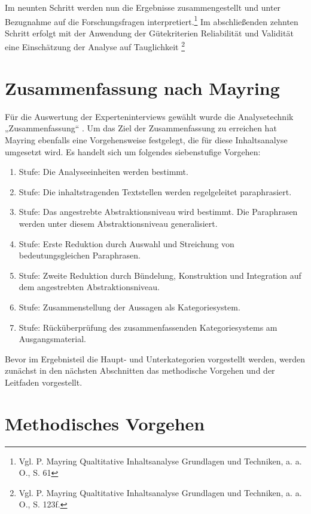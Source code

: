 Im neunten Schritt werden nun die Ergebnisse zusammengestellt und unter Bezugnahme auf die Forschungsfragen interpretiert.\footnote {Vgl. P. Mayring Qualtitative Inhaltsanalyse Grundlagen und Techniken, a. a. O., S. 61}
Im abschließenden zehnten Schritt erfolgt mit der Anwendung der Gütekriterien Reliabilität und Validität eine Einschätzung der Analyse auf Tauglichkeit \footnote {Vgl. P. Mayring Qualtitative Inhaltsanalyse Grundlagen und Techniken, a. a. O., S. 123f.}

\section{Zusammenfassung nach Mayring}

Für die Auswertung der Experteninterviews gewählt wurde die Analysetechnik „Zusammenfassung“ . Um das Ziel der Zusammenfassung zu erreichen hat Mayring ebenfalls eine Vorgehensweise festgelegt, die für diese Inhaltsanalyse umgesetzt wird. Es handelt sich um folgendes siebenstufige Vorgehen:

\begin{enumerate}
    \item Stufe: Die Analyseeinheiten werden bestimmt.
    \item Stufe: Die inhaltstragenden Textstellen werden regelgeleitet paraphrasiert.
    \item Stufe: Das angestrebte Abstraktionsniveau wird bestimmt. Die Paraphrasen werden unter diesem Abstraktionsniveau generalisiert.
    \item Stufe: Erste Reduktion durch Auswahl und Streichung von bedeutungsgleichen Paraphrasen.
    \item Stufe: Zweite Reduktion durch Bündelung, Konstruktion und Integration auf dem angestrebten Abstraktionsniveau.
    \item Stufe: Zusammenstellung der Aussagen als Kategoriesystem.
    \item Stufe: Rücküberprüfung des zusammenfassenden Kategoriesystems am Ausgangsmaterial.
\end{enumerate}

Bevor im Ergebnisteil die Haupt- und Unterkategorien vorgestellt werden, werden zunächst in den nächsten Abschnitten das methodische Vorgehen und der Leitfaden vorgestellt.

\section{Methodisches Vorgehen }

